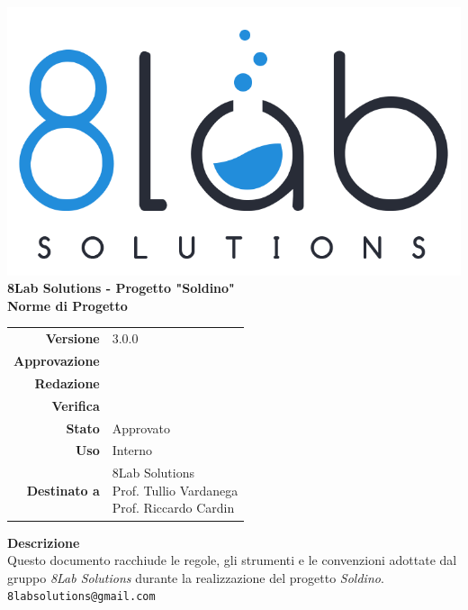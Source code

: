 \thispagestyle{empty}
\begin{titlepage}
	\begin{center}
		\includegraphics[scale = 0.3]{res/images/logo8_crop.png}\\
		\large \textbf{8Lab Solutions - Progetto "Soldino"} \\
		\vfill
		\Huge \textbf{Norme di Progetto}
		\vspace*{\fill} 
        \vfill
        \large
        \begin{tabular}{r|l}
                        \textbf{Versione} & 3.0.0\\
                        \textbf{Approvazione} & \\
                        \textbf{Redazione} & \\
                        	
                      
                        \textbf{Verifica} & 
                        \\
                        \textbf{Stato} & Approvato\\
                        \textbf{Uso} & Interno\\
                        \textbf{Destinato a} & \parbox[t]{5cm}{8Lab Solutions\\Prof. Tullio Vardanega\\Prof. Riccardo Cardin}
                \end{tabular}
                \vfill
                \normalsize
                \textbf{Descrizione}\\
                Questo documento racchiude le regole, gli strumenti e le convenzioni adottate dal gruppo \textit{8Lab Solutions} durante la realizzazione del progetto \textit{Soldino}.\\
                \vfill
                \small
                \texttt{8labsolutions@gmail.com}
	\end{center}
\end{titlepage}